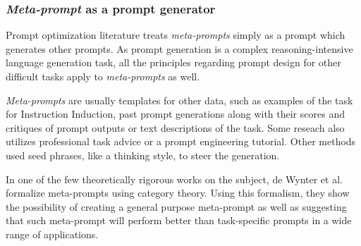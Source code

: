 \subsubsection{\textit{Meta-prompt} as a prompt generator}
Prompt optimization literature\cite{ramnath2025systematicsurveyautomaticprompt} treats \textit{meta-prompts} simply as a prompt which generates other prompts.
As prompt generation is a complex reasoning-intensive language generation task\cite{ye2024promptengineeringpromptengineer}, 
all the principles regarding prompt design for other difficult tasks apply to \textit{meta-prompts} as well.

\textit{Meta-prompts} are usually templates for other data, such as examples of the task for Instruction Induction\cite{honovich2022instructioninductionexamplesnatural},
past prompt generations along with their scores\cite{yang2024largelanguagemodelsoptimizers} and critiques of prompt outputs\cite{he2024crispomultiaspectcritiquesuggestionguidedautomatic}
or text descriptions of the task\cite{ye2024promptengineeringpromptengineer}. Some reseach also utilizes professional task advice\cite{ramnath2025systematicsurveyautomaticprompt}
or a prompt engineering tutorial\cite{ye2024promptengineeringpromptengineer}. Other methods used seed phrases, like a thinking 
style\cite{fernando2023promptbreederselfreferentialselfimprovementprompt}, to steer the generation.

In one of the few theoretically rigorous works on the subject, de Wynter et al.\cite{dewynter2024metaprompting} formalize meta-prompts
using category theory. Using this formalism, they show the possibility of creating a general purpose meta-prompt as well as suggesting that such meta-prompt
will perform better than task-specific prompts in a wide range of applications.